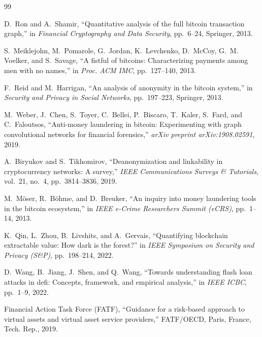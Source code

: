 \documentclass[10pt,twocolumn,a4paper]{article}
\begin{document}
\begin{thebibliography}{99}

D.~Ron and A.~Shamir, ``Quantitative analysis of the full bitcoin transaction graph,'' in \emph{Financial Cryptography and Data Security}, pp.~6--24, Springer, 2013.

S.~Meiklejohn, M.~Pomarole, G.~Jordan, K.~Levchenko, D.~McCoy, G.~M. Voelker, and S.~Savage, ``A fistful of bitcoins: Characterizing payments among men with no names,'' in \emph{Proc. ACM IMC}, pp.~127--140, 2013.

F.~Reid and M.~Harrigan, ``An analysis of anonymity in the bitcoin system,'' in \emph{Security and Privacy in Social Networks}, pp.~197--223, Springer, 2013.

M.~Weber, J.~Chen, S.~Toyer, C.~Bellei, P.~Biscaro, T.~Kaler, S.~Fard, and C.~Faloutsos, ``Anti-money laundering in bitcoin: Experimenting with graph convolutional networks for financial forensics,'' \emph{arXiv preprint arXiv:1908.02591}, 2019.

A.~Biryukov and S.~Tikhomirov, ``Deanonymization and linkability in cryptocurrency networks: A survey,'' \emph{IEEE Communications Surveys \& Tutorials}, vol.~21, no.~4, pp.~3814--3836, 2019.

M.~M{\"o}ser, R.~B{\"o}hme, and D.~Breuker, ``An inquiry into money laundering tools in the bitcoin ecosystem,'' in \emph{IEEE e-Crime Researchers Summit (eCRS)}, pp.~1--14, 2013.

K.~Qin, L.~Zhou, B.~Livshits, and A.~Gervais, ``Quantifying blockchain extractable value: How dark is the forest?'' in \emph{IEEE Symposium on Security and Privacy (S\&P)}, pp.~198--214, 2022.

D.~Wang, B.~Jiang, J.~Shen, and Q.~Wang, ``Towards understanding flash loan attacks in defi: Concepts, framework, and empirical analysis,'' in \emph{IEEE ICBC}, pp.~1--9, 2022.

{Financial Action Task Force (FATF)}, ``Guidance for a risk-based approach to virtual assets and virtual asset service providers,'' FATF/OECD, Paris, France, Tech. Rep., 2019.


\end{thebibliography}
\end{document}
